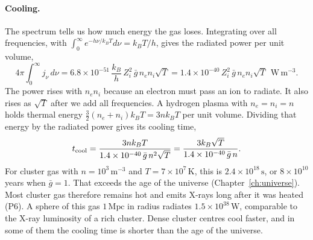 \paragraph{Cooling.} The spectrum tells us how much energy the gas loses. Integrating over all frequencies, with $\int_0^\infty e^{-h\nu/k_BT}d\nu=k_BT/h$, gives the radiated power per unit volume,
\begin{equation}
	\boxed{4\pi\int_0^\infty j_\nu\,d\nu=6.8\times10^{-51}\,\frac{k_B}{h}\,Z_i^2\,\bar g\,n_en_i\sqrt T=1.4\times10^{-40}\,Z_i^2\,\bar g\,n_en_i\sqrt T\ \ \mathrm{W\,m^{-3}} .}
	\label{fp:eq:brems_total}
\end{equation}
The power rises with $n_en_i$ because an electron must pass an ion to radiate. It also rises as $\sqrt T$ after we add all frequencies. A hydrogen plasma with $n_e=n_i=n$ holds thermal energy $\tfrac32(n_e+n_i)k_BT=3nk_BT$ per unit volume. Dividing that energy by the radiated power gives its cooling time,
\[
t_{\rm cool}=\frac{3nk_BT}{1.4\times10^{-40}\,\bar g\,n^2\sqrt T}=\frac{3k_B\sqrt T}{1.4\times10^{-40}\,\bar g\,n} .
\]
For cluster gas with $n=10^3\,\mathrm{m^{-3}}$ and $T=7\times10^7\,\mathrm K$, this is $2.4\times10^{18}\,\mathrm s$, or $8\times10^{10}$ years when $\bar g=1$. That exceeds the age of the universe (Chapter~\ref{ch:universe}). Most cluster gas therefore remains hot and emits X-rays long after it was heated (P6). A sphere of this gas $1\,\mathrm{Mpc}$ in radius radiates $1.5\times10^{38}\,\mathrm W$, comparable to the X-ray luminosity of a rich cluster. Dense cluster centres cool faster, and in some of them the cooling time is shorter than the age of the universe.

